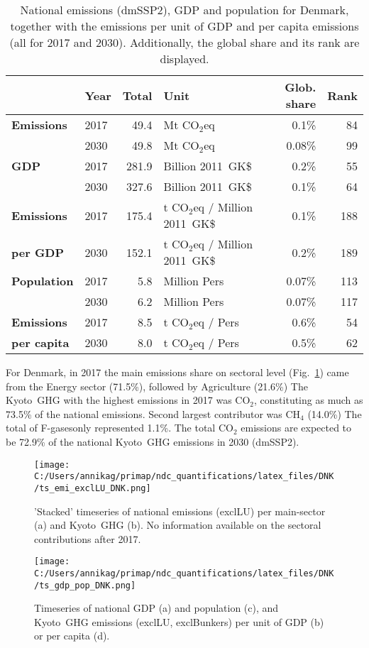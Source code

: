 \documentclass[12pt]{article}
\begin{document}
 \begin{table}[H]
 \centering
 \caption{National emissions (dmSSP2), GDP and population for Denmark, together with the emissions per unit of GDP and per capita emissions (all for 2017 and 2030). 
 Additionally, the global share and its rank are displayed.}
 \label{tab:overview}
 \begin{tabular}{l || l r l r r}
 \bfseries  & \bfseries Year & \bfseries Total & \bfseries Unit & \bfseries Glob. share & \bfseries Rank \tabularnewline \hline \hline
 \bfseries Emissions & 2017 & 49.4 & Mt CO$_2$eq & 0.1\% & 84 \tabularnewline 
 \bfseries  & 2030 & 49.8 & Mt CO$_2$eq & 0.08\% & 99 \tabularnewline \hline
 \bfseries GDP & 2017 & 281.9 & Billion 2011~GK\$ & 0.2\% & 55 \tabularnewline 
 \bfseries  & 2030 & 327.6 & Billion 2011~GK\$ & 0.1\% & 64 \tabularnewline \hline
 \bfseries Emissions & 2017 & 175.4 & t CO$_2$eq / Million 2011~GK\$ & 0.1\% & 188 \tabularnewline 
 \bfseries per GDP & 2030 & 152.1 & t CO$_2$eq / Million 2011~GK\$ & 0.2\% & 189 \tabularnewline \hline
 \bfseries Population & 2017 & 5.8 & Million Pers & 0.07\% & 113 \tabularnewline 
 \bfseries  & 2030 & 6.2 & Million Pers & 0.07\% & 117 \tabularnewline \hline
 \bfseries Emissions & 2017 & 8.5 & t CO$_2$eq /  Pers & 0.6\% & 54 \tabularnewline 
 \bfseries per capita & 2030 & 8.0 & t CO$_2$eq /  Pers & 0.5\% & 62 \tabularnewline 
 \end{tabular}
 \end{table}

 For Denmark, in 2017 the main emissions share on sectoral level (Fig.~\ref{fig:tsEmi}) came from the Energy sector (71.5\%), followed by Agriculture (21.6\%)
 The Kyoto~GHG with the highest emissions in 2017 was CO$_2$, constituting as much as 73.5\% of the national emissions. 
 Second largest contributor was CH$_4$ (14.0\%)
 The total of F-gasesonly represented 1.1\%.
 The total CO$_2$ emissions are expected to be 72.9\% of the national Kyoto~GHG emissions in 2030 (dmSSP2).

 \begin{figure}[H]
 \centering
 \texttt{[image: C:/Users/annikag/primap/ndc\_quantifications/latex\_files/DNK/ts\_emi\_exclLU\_DNK.png]}
 \caption{'Stacked' timeseries of national emissions (exclLU) per main-sector (a) and Kyoto~GHG (b). 
 No information available on the sectoral contributions after 2017.}
 \label{fig:tsEmi}
 \end{figure}

 \begin{figure}[H]
 \centering
 \texttt{[image: C:/Users/annikag/primap/ndc\_quantifications/latex\_files/DNK/ts\_gdp\_pop\_DNK.png]}
 \caption{Timeseries of national GDP (a) and population (c), and Kyoto~GHG emissions (exclLU, exclBunkers) per unit of GDP (b) or per capita (d).}
 \label{fig:tsSocioEco}
 \end{figure}
\end{document}

